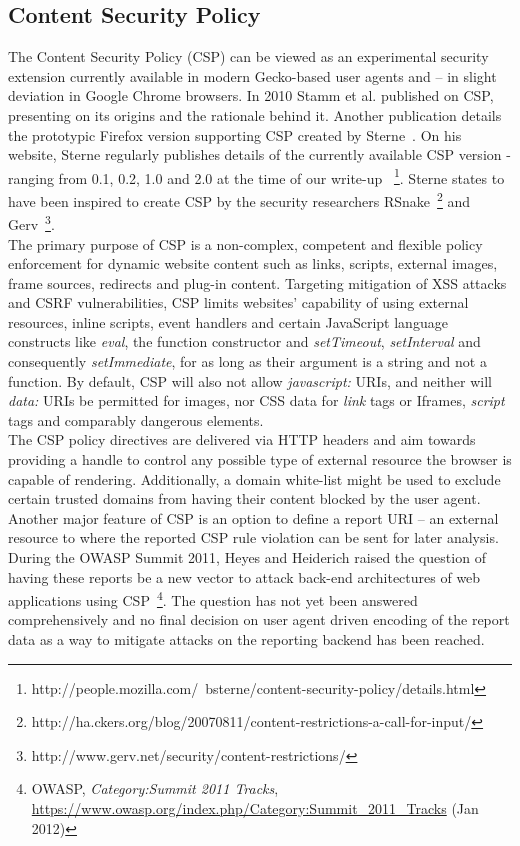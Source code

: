   \subsection{Content Security Policy}
  \label{subsec:4.5.content_security_policy}

  The Content Security Policy (CSP) can be viewed as an experimental security extension currently available in modern Gecko-based user agents and -- in slight deviation in Google Chrome browsers. In 2010 Stamm et al. published on CSP, presenting on its origins and the rationale behind it. Another publication details the prototypic Firefox version supporting CSP created by Sterne~\cite{stamm2010reining}. On his website, Sterne regularly publishes details of the currently available CSP version - ranging from 0.1, 0.2, 1.0 and  2.0 at the time of our write-up ~\footnote{http://people.mozilla.com/~bsterne/content-security-policy/details.html}. Sterne states to have been inspired to create CSP by the security researchers RSnake~\footnote{http://ha.ckers.org/blog/20070811/content-restrictions-a-call-for-input/} and Gerv~\footnote{http://www.gerv.net/security/content-restrictions/}. \\

  The primary purpose of CSP is a non-complex, competent and flexible policy enforcement for dynamic website content such as links, scripts, external images, frame sources, redirects and plug-in content. Targeting mitigation of XSS attacks and CSRF vulnerabilities, CSP limits  websites' capability of using external resources, inline scripts, event handlers and certain JavaScript language constructs like \textit{eval}, the function constructor and \textit{setTimeout}, \textit{setInterval} and consequently \textit{setImmediate}, for as long as their argument is a string and not a function. By default, CSP will also not allow \textit{javascript:} URIs, and neither will \textit{data:} URIs be permitted for images, nor CSS data for \textit{link} tags or Iframes, \textit{script} tags and comparably dangerous elements. \\

  The CSP policy directives are delivered via HTTP headers and aim towards providing a handle to control any possible type of external resource the browser is capable of rendering. Additionally, a domain white-list might be used to exclude certain trusted domains from having their content blocked by the user agent. Another major feature of CSP is an option to define a report URI -- an external resource to where the reported CSP rule violation can be sent for later analysis. During the OWASP Summit 2011, Heyes and Heiderich raised the question of having these reports be a new vector to attack back-end architectures of web applications using CSP~\footnote{OWASP, \textit{Category:Summit 2011 Tracks}, \url{https://www.owasp.org/index.php/Category:Summit_2011_Tracks} (Jan 2012)}. 
  The question has not yet been answered comprehensively and no final decision on user agent driven encoding of the report data as a way to mitigate attacks on the reporting backend has been reached.\\

